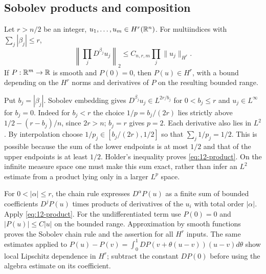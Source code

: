 \subsection{Sobolev products and composition}
\begin{theorem}
Let $r>n/2$ be an integer, $u_1,\ldots,u_m\in H^r(\mathbb{R}^n)$.
For multiindices with $\sum_j|\beta_j|\le r$,
\begin{equation}\label{eq:12-product}
 \left\|\prod_jD^{\beta_j}u_j\right\|_2
 \le C_{n,r,m}\prod_j\|u_j\|_{H^r}.
\end{equation}
If $P:\mathbb{R}^m\to\mathbb{R}$ is smooth and $P(0)=0$, then $P(u)\in H^r$,
with a bound depending on the $H^r$ norms and derivatives of $P$
on the resulting bounded range.
\end{theorem}
\begin{expandedproof}
Put $b_j=|\beta_j|$. Sobolev embedding gives
$D^{\beta_j}u_j\in L^{2r/b_j}$ for $0<b_j\le r$ and $u_j\in L^\infty$
for $b_j=0$. Indeed for $b_j<r$ the choice $1/p=b_j/(2r)$ lies
strictly above $1/2-(r-b_j)/n$, since $2r>n$; $b_j=r$ gives $p=2$.
Each derivative also lies in $L^2$. By interpolation choose
$1/p_j\in[b_j/(2r),1/2]$ so that $\sum_j1/p_j=1/2$.
This is possible because the sum of the lower endpoints is at most
$1/2$ and that of the upper endpoints is at least $1/2$.
Holder's inequality proves \eqref{eq:12-product}. On the infinite
measure space one must make this sum exact, rather than infer an
$L^2$ estimate from a product lying only in a larger $L^p$ space.

For $0<|\alpha|\le r$, the chain rule expresses $D^\alpha P(u)$
as a finite sum of bounded coefficients $D^jP(u)$ times products
of derivatives of the $u_i$ with total order $|\alpha|$.
Apply \eqref{eq:12-product}. For the undifferentiated term use
$P(0)=0$ and $|P(u)|\le C|u|$ on the bounded range.
Approximation by smooth functions proves the Sobolev chain rule
and the assertion for all $H^r$ inputs. The same estimates applied
to $P(u)-P(v)=\int_0^1DP(v+\theta(u-v))(u-v)d\theta$ show local
Lipschitz dependence in $H^r$; subtract the constant $DP(0)$ before
using the algebra estimate on its coefficient.
\end{expandedproof}

